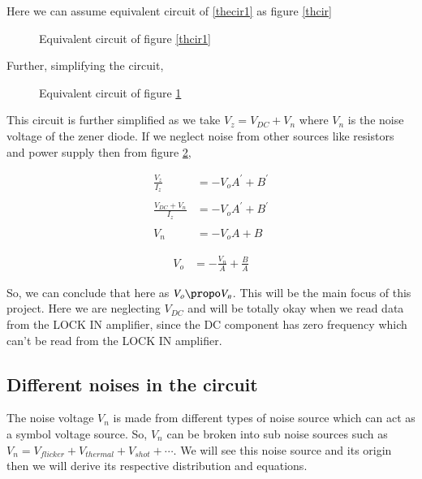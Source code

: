 \documentclass[final,5p,12pt,twocolumn]{elsaarticle}
\begin{document}
Here we can assume equivalent circuit of \ref{thecir1} as figure \ref{thcir} 

\begin{figure}[hbt!]
\caption{Equivalent circuit of figure \ref{thcir1} \label{thcir2}}
\end{figure}

Further, simplifying the circuit,

\begin{figure}[hbt!]
\caption{Equivalent circuit of figure \ref{thcir2} \label{thcir3}}
\end{figure}

This circuit is further simplified as we take $V_z = V_{DC} + V_n$ where $V_n$ is the noise voltage of the zener diode.
If we neglect noise from other sources like resistors and power supply then from figure \ref{thcir3},

\begin{align*}
\frac{V_z}{I_z} & = -V_oA^{\prime} +B^{\prime}\\
  \\
\frac{V_{DC}+V_n}{I_z} & =  -V_oA^{\prime} +B^{\prime}\\
\\  
V_n & = -V_oA+B
\end{align*}


\begin{align} \label{vo}
V_o & = -\frac{V_n}{A}+\frac{B}{A}
\end{align}



So, we can conclude that here as $V_o \propo V_n$.  This will be the main focus of this project. Here we are neglecting $V_{DC}$ and will be totally okay when we read data from the LOCK IN amplifier, since the DC component has zero frequency which can’t be read from the LOCK IN amplifier.

\subsection{Different noises in the circuit \label{thno}}

The noise voltage $V_n$ is made from different types of noise source which can act as a symbol voltage source. So, $V_n$ can be broken into sub noise sources such as $V_n = V_{flicker}+V_{thermal} + V_{shot} +\cdots$. We will see this noise source and its origin then we will derive its respective distribution and equations.
\end{document}
